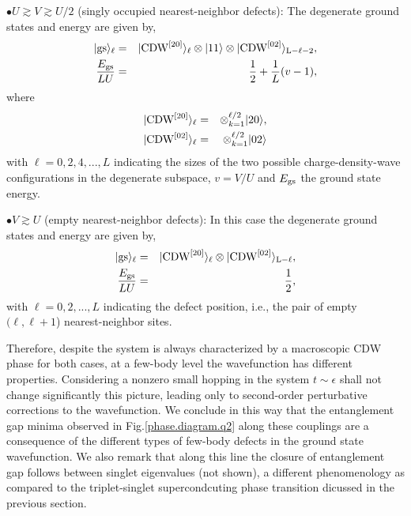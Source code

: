 \documentclass[prb,reprint,showpacs,twocolumn,superscriptaddress]{revtex4-2}
\begin{document}
$\bullet U \gtrsim  V \gtrsim U/2$ (singly occupied nearest-neighbor defects): The degenerate ground states and energy are given by,
\begin{eqnarray}
 |\rm{gs}\rangle_\ell &=& |\rm{CDW}^{[20]}\rangle_\ell \otimes |1 1\rangle \otimes 
 |\rm{CDW}^{[02]} \rangle_{L-\ell-2}, \nonumber \\
 \frac{E_{\rm{gs}}}{L U} &=& \frac{1}{2} + \frac{1}{L}(v-1),
\end{eqnarray}
where 
\begin{eqnarray}
 |\rm{CDW}^{[20]}\rangle_{\ell} &=& \otimes_{k=1}^{\ell/2} |20\rangle, \\
 |\rm{CDW}^{[02]}\rangle_{\ell} &=& \otimes_{k=1}^{\ell/2} |02\rangle 
\end{eqnarray}
with $\ell = 0,2,4,...,L$ indicating the sizes of the two possible charge-density-wave configurations in the degenerate subspace, $v=V/U$ and $E_{\rm gs}$ the ground state energy.

$\bullet V \gtrsim U$ (empty nearest-neighbor defects): In this case the degenerate ground states and energy are given by,
\begin{eqnarray}
 |\rm{gs}\rangle_\ell &=& |\rm{CDW}^{[20]}\rangle_\ell \otimes 
 |\rm{CDW}^{[02]} \rangle_{L-\ell}, \nonumber \\
 \frac{E_{\rm{gs}}}{L U} &=& \frac{1}{2},
\end{eqnarray}
with $\ell = 0,2,...,L$ indicating the defect position, i.e., the pair of empty $(\ell,\ell+1$) nearest-neighbor sites.

Therefore, despite the system is always characterized by a macroscopic CDW phase for both cases, at a few-body level the wavefunction has different properties. Considering a nonzero small hopping in the system $t \sim \epsilon$  shall not  change significantly this picture, leading only to second-order perturbative corrections to the wavefunction. We conclude in this way that the entanglement gap minima observed in Fig.\eqref{phase.diagram.q2} along these couplings are a consequence of the different types of few-body defects in the ground state wavefunction. We also remark that along this line the closure of entanglement gap follows between singlet eigenvalues (not shown), a different phenomenology as compared to the triplet-singlet supercondcuting phase transition dicussed in the previous section.
\end{document}
